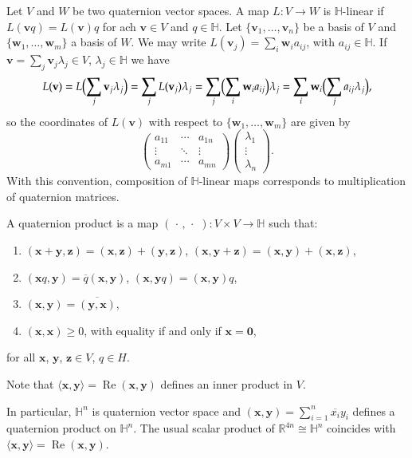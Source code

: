 \documentclass[12pt, a4paper]{amsart}
\newcommand{\R}{\mathbb{R}}
\renewcommand{\H}{\mathbb{H}}
\renewcommand{\Re}{\operatorname{Re}}
\theoremstyle{remark}
\begin{document}
Let $V$ and $W$ be two quaternion vector spaces. 
A map $L\colon V\to W$ is $\H$-linear if $L(\mathbf{v}q)=L(\mathbf{v})q$ for ach $\mathbf{v}\in V$ and $q\in\H$. Let $\{\mathbf{v}_1,\dots,\mathbf{v}_n\}$ be a basis of $V$ and $\{\mathbf{w}_1,\dots,\mathbf{w}_m\}$ a basis of $W$. 
We may write $L(\mathbf{v}_j)=\sum_i \mathbf{w}_i a_{ij}$, with $a_{ij}\in\H$. 
If $\mathbf{v}=\sum_j \mathbf{v}_j\lambda_j\in V$, $\lambda_j\in\H$ we have 
\[
L(\mathbf{v})
=L\Bigl(\sum_j \mathbf{v}_j\lambda_j\Bigr)
=\sum_j L(\mathbf{v}_j)\lambda_j{}=\sum_j\Bigl(\sum_i \mathbf{w}_i a_{ij}\Bigr)\lambda_j
=\sum_{i}\mathbf{w}_i\Bigl(\sum_j a_{ij}\lambda_j\Bigr),
\]
so the coordinates of $L(\mathbf{v})$ with respect to $\{\mathbf{w}_1,\dots,\mathbf{w}_m\}$ are given by
\[
\begin{pmatrix}
a_{11} & \cdots & a_{1n}\\
\vdots & \ddots & \vdots\\
a_{m1} & \cdots & a_{mn}
\end{pmatrix}
\begin{pmatrix}
\lambda_1\\
\vdots\\
\lambda_n
\end{pmatrix}.
\]
With this convention, composition of $\H$-linear maps corresponds to multiplication of quaternion matrices.

A quaternion product is a map $(\,\cdot\,,\,\cdot\,\,)\colon V\times V\to\H$ such that:
\begin{enumerate}
\item $(\mathbf{x}+\mathbf{y},\mathbf{z})
=(\mathbf{x},\mathbf{z})+(\mathbf{y},\mathbf{z})$,
$(\mathbf{x},\mathbf{y}+\mathbf{z})
=(\mathbf{x},\mathbf{y})+(\mathbf{x},\mathbf{z})$,
\item $(\mathbf{x}q,\mathbf{y})=\overline{q}(\mathbf{x},\mathbf{y})$, $(\mathbf{x},\mathbf{y}q)=(\mathbf{x},\mathbf{y}) q$,
\item $(\mathbf{x},\mathbf{y})=\overline{(\mathbf{y},\mathbf{x})}$,
\item $(\mathbf{x},\mathbf{x})\geq 0$, with equality if and only if $\mathbf{x}=\mathbf{0}$,
\end{enumerate}
for all $\mathbf{x}$, $\mathbf{y}$, $\mathbf{z}\in V$, $q\in H$.

Note that $\langle\mathbf{x},\mathbf{y}\rangle=\Re(\mathbf{x},\mathbf{y})$ defines an inner product in $V$.

In particular, $\H^n$ is quaternion vector space and $(\mathbf{x},\mathbf{y})=\sum_{i=1}^n \overline{x_i}y_i$ defines a quaternion product on $\H^n$. The usual scalar product of $\R^{4n}\cong\H^n$ coincides with $\langle\mathbf{x},\mathbf{y}\rangle=\Re(\mathbf{x},\mathbf{y})$.
\end{document}
